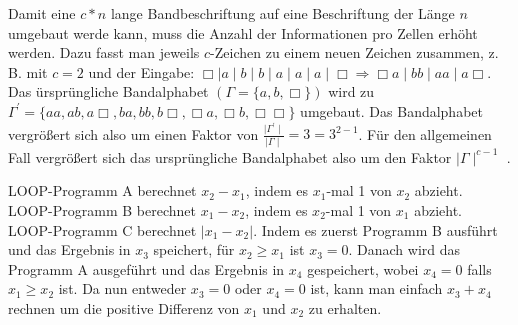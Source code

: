 \documentclass[a4]{exam}
\begin{document}
\begin{questions}
\setcounter{question}{11} 

%
%
Damit eine $c*n$ lange Bandbeschriftung auf eine Beschriftung der Länge $n$ umgebaut werde kann, muss die Anzahl der Informationen pro Zellen erhöht werden. Dazu fasst man jeweils $c$-Zeichen zu einem neuen Zeichen zusammen, z. B. mit $c = 2$ und der Eingabe: $\Box \mid a\mid b \mid b \mid a \mid a \mid a \mid \Box \Rightarrow \Box a \mid bb \mid aa \mid a\Box$. Das ürsprüngliche Bandalphabet  $(\Gamma = \{a,b,\Box\})$ wird zu $\Gamma^\prime = \{aa,ab,a\Box,ba,bb,b\Box,\Box a,\Box b, \Box\Box\}$ umgebaut. Das Bandalphabet vergrößert sich also um einen Faktor von $ \frac{ \mid \Gamma^\prime\mid}{\mid \Gamma \mid} = 3 = 3^{2-1}$. Für den allgemeinen Fall vergrößert sich das ursprüngliche Bandalphabet also um den Faktor $ \mid\Gamma\mid^{c-1}$ .

%
%
LOOP-Programm A berechnet $x_2 - x_1$, indem es $x_1$-mal 1 von $x_2$ abzieht. \\
LOOP-Programm B berechnet $x_1 - x_2$, indem es $x_2$-mal 1 von $x_1$ abzieht. \\
LOOP-Programm C berechnet $\lvert x_1 - x_2 \rvert$. Indem es zuerst Programm B ausführt und das Ergebnis in $x_3$ speichert, für $x_2 \ge x_1$ ist $x_3 = 0$. Danach wird das Programm A ausgeführt und das Ergebnis in $x_4$ gespeichert, wobei $x_4 = 0$ falls $x_1 \ge x_2$ ist. Da nun entweder $x_3 = 0$ oder $x_4 = 0$ ist, kann man einfach $x_3 + x_4$ rechnen um die positive Differenz von $x_1$ und $x_2$ zu erhalten.\\

%
%
\end{questions}
\end{document}
